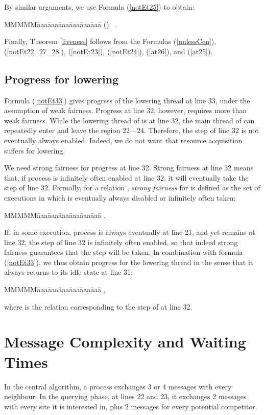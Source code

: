 \documentclass[10pt]{article} \usepackage[english]{babel}
\makeatletter
\newenvironment{tab}{\begin{tabbing}
MMMMM\=aaa\=aaa\=aaa\=aaa\=aaa\=aaa\= \kill}{\end{tabbing}}
\def\refmystepcounter#1{\stepcounter{#1}\protect\gdef 
\@currentlabel {\csname p@#1\endcsname \csname 
the#1\endcsname}}
\newcounter {tabnr}
\newenvironment{tabn}{\begin{tabbing}
\refmystepcounter{tabnr}
MMMMM\=aaa\=aaa\=aaa\=aaa\=aaa\=aaa\= \kill
(\arabic{tabnr})~}{\end{tabbing}}
\makeatother
\begin{document}
By similar arguments, we use Formula (\ref{notEt25}) to obtain:
\begin{tabn} \label{at25} 
  \>  .
\end{tabn}

Finally, Theorem \ref{liveness} follows from the Formulas (\ref{unlessCen}),
(\ref{notEt22_27_28}), (\ref{notEt23}), (\ref{notEt24}), 
(\ref{at26}), and (\ref{at25}).  

\subsection{Progress for lowering} \label{progressLow}

Formula (\ref{notEt33}) gives progress of the lowering thread at line 33,
under the assumption of weak fairness.  Progress at line 32, however,
requires more than weak fairness.  While the lowering thread of  is
at line 32, the main thread of  can repeatedly enter and leave the
region 22---24.  Therefore, the step of line 32 is not eventually
always enabled.  Indeed, we do not want that resource acquisition
suffers for lowering. 

We need strong fairness for progress at line 32.  Strong fairness at
line 32 means that, if process  is infinitely often enabled at line
32, it will eventually take the step of line 32.  Formally, for a
relation , \emph{strong fairness} \cite{Lam94} for 
is defined as the set of executions in which  is eventually always
disabled or infinitely often taken:
\begin{tab}
  \>  .
\end{tab}

If, in some execution, process  is always eventually at line 21,
and yet remains at line 32, the step of line 32 is infinitely often
enabled, so that indeed strong fairness guarantees that the step will
be taken.  In combination with formula (\ref{notEt33}), we thus obtain
progress for the lowering thread in the sense that it always returns
to its idle state at line 31:
\begin{tab}
\>  ,
\end{tab}
where  is the relation corresponding to the step of 
at line 32.



\section {Message Complexity and Waiting Times} 
\label{summ_alg}

In the central algorithm, a process exchanges 3 or 4 messages with
every neighbour.  In the querying phase, at lines 22 and 23, it
exchanges 2 messages with every site it is interested in, plus 2
messages for every potential competitor.
\end{document}
